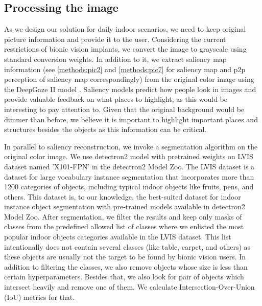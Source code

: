 \subsection{Processing the image}
\label{methods:processing}

As we design our solution for daily indoor scenarios, we need to keep original picture information and provide it to the user.
Considering the current restrictions of bionic vision implants, we convert the image to grayscale using standard conversion weights. In addition to it, we extract saliency map information (see \autoref{methods:pic2} and \autoref{methods:pic7} for saliency map and p2p perception of saliency map correspondingly) from the original color image using the DeepGaze II model \cite{kmmerer2016deepgaze}. Saliency models predict how people look in images and provide valuable feedback on what places to highlight, as this would be interesting to pay attention to. Given that the original background would be dimmer than before, we believe it is important to highlight important places and structures besides the objects as this information can be critical. 

In parallel to saliency reconstruction, we invoke a segmentation algorithm on the original color image. We use detectron2 model \cite{wu2019detectron2} with pretrained weights on LVIS dataset \cite{gupta2019lvis} named 'X101-FPN' in the detectron2 Model Zoo. The LVIS dataset is a dataset for large vocabulary instance segmentation that incorporates more than 1200 categories of objects, including typical indoor objects like fruits, pens, and others. This dataset is, to our knowledge, the best-suited dataset for indoor instance object segmentation with pre-trained models available in detectron2 Model Zoo. After segmentation, we filter the results and keep only masks of classes from the predefined allowed list of classes where we enlisted the most popular indoor objects categories available in the LVIS dataset. This list intentionally does not contain several classes (like table, carpet, and others) as these objects are usually not the target to be found by bionic vision users. In addition to filtering the classes, we also remove objects whose size is less than certain hyperparameters. Besides that, we also look for pair of objects which intersect heavily and remove one of them. We calculate Intersection-Over-Union (IoU) metrics for that.

